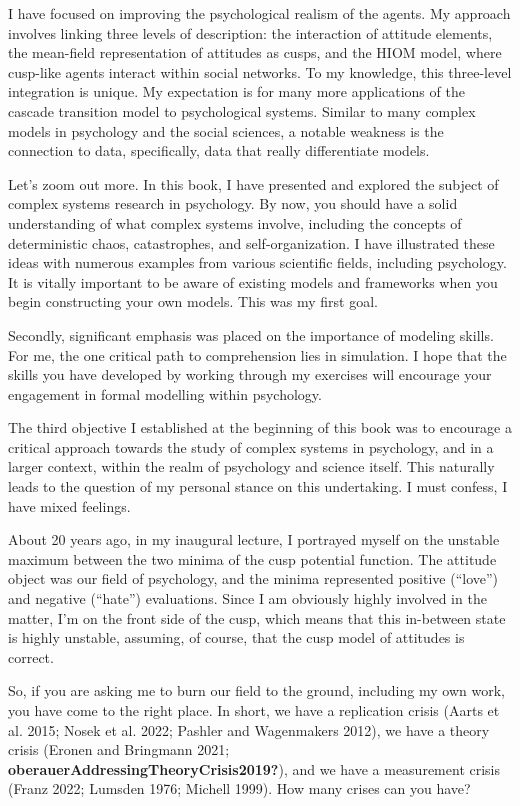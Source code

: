 \documentclass[
  letterpaper,
]{scrbook}
\begin{document}
I have focused on improving the psychological realism of the agents. My
approach involves linking three levels of description: the interaction
of attitude elements, the mean-field representation of attitudes as
cusps, and the HIOM model, where cusp-like agents interact within social
networks. To my knowledge, this three-level integration is unique. My
expectation is for many more applications of the cascade transition
model to psychological systems. Similar to many complex models in
psychology and the social sciences, a notable weakness is the connection
to data, specifically, data that really differentiate models.

Let's zoom out more. In this book, I have presented and explored the
subject of complex systems research in psychology. By now, you should
have a solid understanding of what complex systems involve, including
the concepts of deterministic chaos, catastrophes, and
self-organization. I have illustrated these ideas with numerous examples
from various scientific fields, including psychology. It is vitally
important to be aware of existing models and frameworks when you begin
constructing your own models. This was my first goal.

Secondly, significant emphasis was placed on the importance of modeling
skills. For me, the one critical path to comprehension lies in
simulation. I hope that the skills you have developed by working through
my exercises will encourage your engagement in formal modelling within
psychology.

The third objective I established at the beginning of this book was to
encourage a critical approach towards the study of complex systems in
psychology, and in a larger context, within the realm of psychology and
science itself. This naturally leads to the question of my personal
stance on this undertaking. I must confess, I have mixed feelings.

About 20 years ago, in my inaugural lecture, I portrayed myself on the
unstable maximum between the two minima of the cusp potential function.
The attitude object was our field of psychology, and the minima
represented positive (``love'') and negative (``hate'') evaluations.
Since I am obviously highly involved in the matter, I'm on the front
side of the cusp, which means that this in-between state is highly
unstable, assuming, of course, that the cusp model of attitudes is
correct.

So, if you are asking me to burn our field to the ground, including my
own work, you have come to the right place. In short, we have a
replication crisis (Aarts et al. 2015; Nosek et al. 2022; Pashler and
Wagenmakers 2012), we have a theory crisis (Eronen and Bringmann 2021;
\textbf{oberauerAddressingTheoryCrisis2019?}), and we have a measurement
crisis (Franz 2022; Lumsden 1976; Michell 1999). How many crises can you
have?
\end{document}
